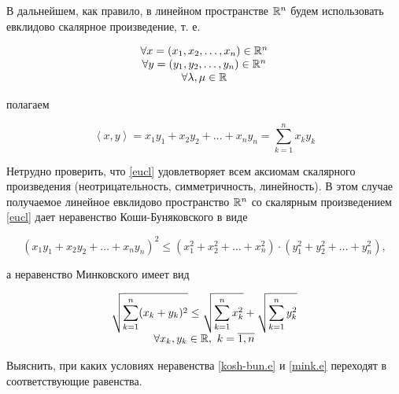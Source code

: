 \documentclass[../../main.tex]{subfiles}
\begin{document}
\begin{rem}
 В дальнейшем, как правило, в линейном пространстве $\mathbb{R}^n$ будем 
 использовать евклидово скалярное произведение, т. е.

 \[
 \begin{array}{c}
  \forall x = (x_1, x_2, \dots, x_n) \in \mathbb{R}^n \\
  \forall y = (y_1, y_2, \dots, y_n) \in \mathbb{R}^n \\
  \forall \lambda, \mu \in \mathbb{R}
 \end{array}
 \]
 
 полагаем
 
 \begin{equation}
  \label{eucl}
  \left<x, y\right> = x_1y_1 + x_2y_2 + \dots + x_ny_n =
  \sum_{k=1}^n x_ky_k
 \end{equation}

 Нетрудно проверить, что \eqref{eucl} удовлетворяет всем аксиомам 
 скалярного произведения (неотрицательность, симметричность, 
 линейность). В этом случае получаемое линейное евклидово пространство
 $\mathbb{R}^n$ со скалярным произведением \eqref{eucl} дает неравенство
 Коши-Буняковского в виде
 
 \begin{equation}
  \label{kosh-bun.e}
  \left(x_1y_1 + x_2y_2 + \dots + x_ny_n\right)^2 \le
  \left(x_1^2 + x_2^2 + \dots + x_n^2\right)\cdot
  \left(y_1^2 + y_2^2 + \dots + y_n^2\right),
 \end{equation}
 
 а неравенство Минковского имеет вид
 
 \begin{equation}
  \label{mink.e}
  \begin{array}{c}
   \displaystyle
   \sqrt{\sum_{k=1}^n (x_k + y_k)^2} \le
   \sqrt{\sum_{k=1}^n x_k^2} + \sqrt{\sum_{k=1}^n y_k^2} \\
   \forall x_k, y_k \in \mathbb{R},\ k = \overline{1, n}
  \end{array}
 \end{equation}
 
\end{rem}

\begin{exc}
 Выяснить, при каких условиях неравенства \eqref{kosh-bun.e} и 
 \eqref{mink.e} переходят в соответствующие равенства.
\end{exc}
\end{document}
